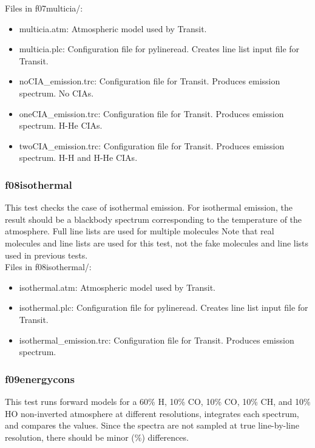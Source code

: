 \documentclass[letterpaper, 12pt]{article}
\begin{document}
Files in f07multicia/:
\begin{itemize} \itemsep0pt
  \item multicia.atm: Atmospheric model used by Transit.
  \item multicia.plc: Configuration file for pylineread. Creates 
        line list input file for Transit.
  \item noCIA{\_}emission.trc: Configuration file for Transit. Produces 
        emission spectrum. No CIAs.
  \item oneCIA{\_}emission.trc: Configuration file for Transit. Produces 
        emission spectrum. H-He CIAs.
  \item twoCIA{\_}emission.trc: Configuration file for Transit. Produces 
        emission spectrum. H-H and H-He CIAs.
\end{itemize}

\subsubsection{f08isothermal}
\label{sec:isothermal}
This test checks the case of isothermal emission. For isothermal emission, 
the result should be a blackbody spectrum corresponding to the temperature 
of the atmosphere. Full line lists are used for multiple molecules 
Note that real molecules and line lists are used for this test, not the 
fake molecules and line lists used in previous tests.\\

Files in f08isothermal/:
\begin{itemize} \itemsep0pt
  \item isothermal.atm: Atmospheric model used by Transit.
  \item isothermal.plc: Configuration file for pylineread. Creates 
        line list input file for Transit.
  \item isothermal{\_}emission.trc: Configuration file for Transit. Produces 
        emission spectrum.
\end{itemize}

\subsubsection{f09energycons}
\label{sec:energycons}
This test runs forward models for a 60\% H, 10\% CO, 10\% CO, 10\% CH, and 10\% HO non-inverted atmosphere at different resolutions, integrates each spectrum, and compares the values. Since the spectra are not sampled at true line-by-line resolution, there should be minor (\%) differences.
\end{document}
